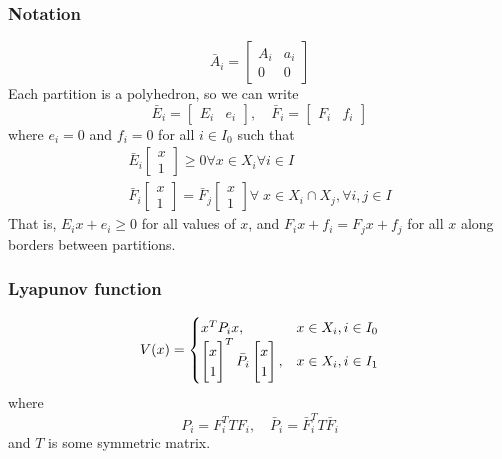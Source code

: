 \subsubsection{Notation}
\begin{equation}
  \bar{A}_i = \begin{bmatrix} A_i & a_i \\ 0 & 0 \end{bmatrix}
\end{equation}
%
Each partition is a polyhedron, so we can write
%
\begin{equation}
  \bar{E}_i = \begin{bmatrix} E_i & e_i \end{bmatrix}, \quad
  \bar{F}_i = \begin{bmatrix} F_i & f_i \end{bmatrix}
\end{equation}
%
where $e_i = 0$ and $f_i = 0$ for all $i \in I_0$ such that
%
\begin{gather}
  \bar{E}_i \begin{bmatrix} x \\ 1 \end{bmatrix} \geq 0 \forall x \in X_i \forall i \in I \\
  \bar{F}_i \begin{bmatrix} x \\ 1 \end{bmatrix} = \bar{F}_j \begin{bmatrix} x \\ 1 \end{bmatrix} \forall\; x \in X_i \cap X_j, \forall i, j \in I
\end{gather}
%
That is, $E_i x + e_i \geq 0$ for all values of $x$, and $F_i x + f_i = F_j x + f_j$ for all $x$ along borders between partitions.

\subsubsection{Lyapunov function}
\begin{equation}
  V(x) =
  \begin{cases}
    x^{T} P_i x, &x \in X_i, i \in I_0 \\
    \begin{bmatrix} x\\1 \end{bmatrix}^{T} \bar{P}_i \begin{bmatrix} x\\1 \end{bmatrix}, &x \in X_i, i \in I_1
  \end{cases}
\end{equation}
%
where
%
\begin{equation}\label{eq:pwa-lyapunov-matrix}
    P_i = F_i^T T F_i,\quad \bar{P}_i = \bar{F}_i^T T \bar{F}_i
\end{equation}
%
and $T$ is some symmetric matrix.

